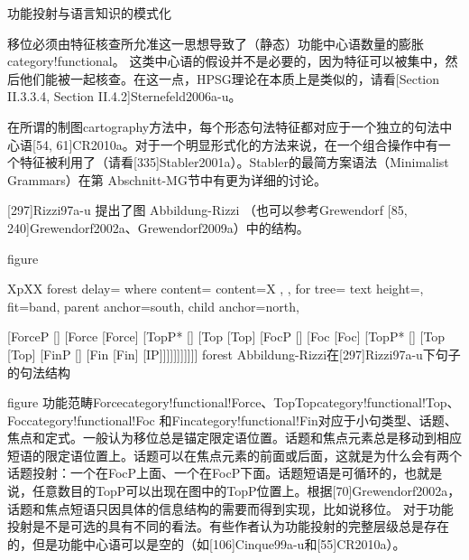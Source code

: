 功能投射与语言知识的模式化


移位必须由特征核查所允准这一思想导致了（静态）功能中心语数量的膨胀category!functional。 
这类中心语的假设并不是必要的，因为特征可以被集中，然后他们能被一起核查。在这一点，HPSG理论在本质上是类似的，请看[Section II.3.3.4, Section II.4.2]Sternefeld2006a-u。

在所谓的制图cartography方法中，每个形态句法特征都对应于一个独立的句法中心语[54, 61]CR2010a。对于一个明显形式化的方法来说，在一个组合操作中有一个特征被利用了（请看[335]Stabler2001a）。Stabler的最简方案语法（Minimalist Grammars）在第 Abschnitt-MG节中有更为详细的讨论。
 
[297]Rizzi97a-u 提出了图 Abbildung-Rizzi （也可以参考Grewendorf [85, 240]Grewendorf2002a、Grewendorf2009a）中的结构。
















figure


XpXX
forest
  delay=
    where content=
      content=X
    ,
  ,
  for tree=
    text height=,
    fit=band,
    parent anchor=south,
    child anchor=north,
  
[ForceP
	[]
	[Force
		[Force]
		[TopP*
			[]
			[Top
				[Top]
				[FocP
					[]
					[Foc
						[Foc]
						[TopP*
							[]
							[Top
								[Top]
								[FinP
									[]
									[Fin
										[Fin]
										[IP]]]]]]]]]]]
forest
Abbildung-Rizzi在[297]Rizzi97a-u下句子的句法结构

figure
功能范畴Forcecategory!functional!Force、TopTopcategory!functional!Top、Foccategory!functional!Foc 和Fincategory!functional!Fin对应于小句类型、话题、焦点和定式。一般认为移位总是锚定限定语位置。话题和焦点元素总是移动到相应短语的限定语位置上。话题可以在焦点元素的前面或后面，这就是为什么会有两个话题投射：一个在FocP上面、一个在FocP下面。话题短语是可循环的，也就是说，任意数目的TopP可以出现在图中的TopP位置上。根据[70]Grewendorf2002a，话题和焦点短语只因具体的信息结构的需要而得到实现，比如说移位。 
对于功能投射是不是可选的具有不同的看法。有些作者认为功能投射的完整层级总是存在的，但是功能中心语可以是空的（如[106]Cinque99a-u和[55]CR2010a）。
  










